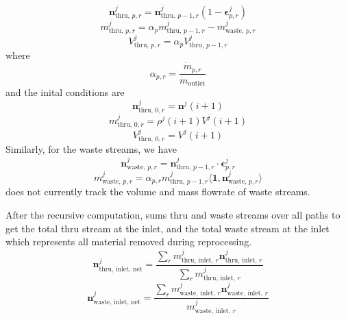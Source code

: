 \begin{equation}
    \mathbf{n}^{j}_{\text{thru, }p,r} = \mathbf{n}^{j}_{\text{thru, }p-1,r} (1 - \mathbf{\epsilon}^{j}_{p,r})
\end{equation}
\begin{equation}
    m^{j}_{\text{thru, } p,r} = \alpha_{p} m^{j}_{\text{thru, }p-1,r} - m^{j}_{\text{waste, }p,r}
\end{equation}
\begin{equation}
    V^{j}_{\text{thru, }p,r} = \alpha_{p}V^{j}_{\text{thru, }p-1,r}
\end{equation}
where 
\begin{equation}
    \alpha_{p,r} = \frac{\dot{m}_{p,r}}{\dot{m}_{\text{outlet}}}
\end{equation}
and the inital conditions are 
\begin{equation}
    \mathbf{n}^{j}_{\text{thru, }0,r} = \mathbf{n}^{j}(i+1)
\end{equation}
\begin{equation}
    m^{j}_{\text{thru, }0,r} = \rho^{j}(i+1)V^{j}(i+1)
\end{equation}
\begin{equation}
    V^{j}_{\text{thru, }0,r} = V^{j}(i+1)
\end{equation}
Similarly, for the waste streams, we have
\begin{equation}
    \mathbf{n}^{j}_{\text{waste, }p,r} = \mathbf{n}^{j}_{\text{thru, }p-1,r} \cdot \mathbf{\epsilon}^{j}_{p,r}
\end{equation}
\begin{equation}
    m^{j}_{\text{waste, }p,r} = \alpha_{p,r} m^{j}_{\text{thru, }p-1,r} \langle\mathbf{1},\mathbf{n}^{j}_{\text{waste, }p,r}\rangle
\end{equation}
\SaltProc does not currently track the volume and mass flowrate of waste streams.

After the recursive computation, \SaltProc sums thru and waste streams over all
paths to get the total thru stream at the inlet, and the total waste stream at
the inlet which represents all material removed during reprocessing.
\begin{equation}
    \mathbf{n}^{j}_{\text{thru, inlet, net}} = \frac{\sum_{r} m^{j}_{\text{thru, inlet, }r} \mathbf{n}^{j}_{\text{thru, inlet, }r}}{\sum_{r} m^{j}_{\text{thru, inlet, }r}}
\end{equation}
\begin{equation}
    \mathbf{n}^{j}_{\text{waste, inlet, net}} = \frac{\sum_{r} m^{j}_{\text{waste, inlet, }r} \mathbf{n}^{j}_{\text{waste, inlet, }r}}{m^{j}_{\text{waste, inlet, }r}}
\end{equation}

